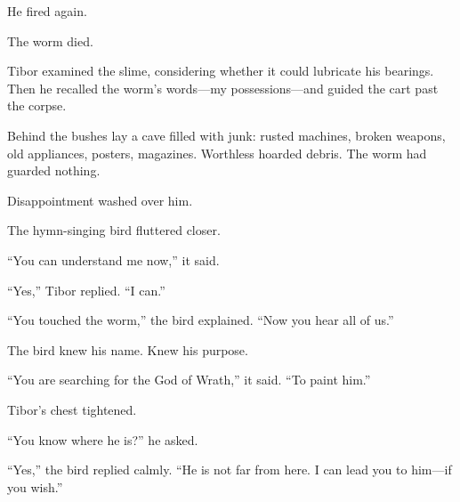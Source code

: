 He fired again.

The worm died.

Tibor examined the slime, considering whether it could lubricate his bearings. Then he recalled the worm’s words—my possessions—and guided the cart past the corpse.

Behind the bushes lay a cave filled with junk: rusted machines, broken weapons, old appliances, posters, magazines. Worthless hoarded debris. The worm had guarded nothing.

Disappointment washed over him.

The hymn-singing bird fluttered closer.

“You can understand me now,” it said.

“Yes,” Tibor replied. “I can.”

“You touched the worm,” the bird explained. “Now you hear all of us.”

The bird knew his name. Knew his purpose.

“You are searching for the God of Wrath,” it said. “To paint him.”

Tibor’s chest tightened.

“You know where he is?” he asked.

“Yes,” the bird replied calmly. “He is not far from here. I can lead you to him—if you wish.”
